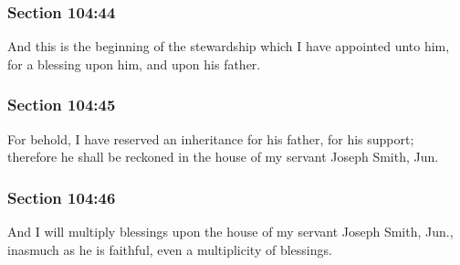 	\subsubsection{Section 104:44} %
		\label{DC104-44}

		And this is the beginning of the stewardship which I have appointed unto him, for a blessing upon him, and upon his father.


	\subsubsection{Section 104:45} %
		\label{DC104-45}

		For behold, I have reserved an inheritance for his father, for his support; therefore he shall be reckoned in the house of my servant Joseph Smith, Jun.


	\subsubsection{Section 104:46} %
		\label{DC104-46}

		And I will multiply blessings upon the house of my servant Joseph Smith, Jun., inasmuch as he is faithful, even a multiplicity of blessings.


